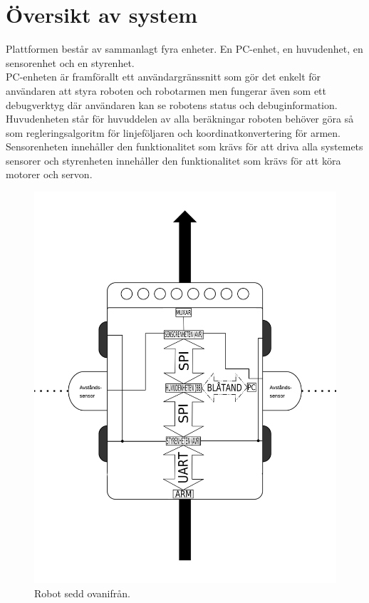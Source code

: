 \section{Översikt av system}
Plattformen består av sammanlagt fyra enheter. En PC-enhet, en huvudenhet, en sensorenhet och en styrenhet. \\
PC-enheten är framförallt ett användargränssnitt som gör det enkelt för användaren att styra roboten och robotarmen men fungerar även som ett debugverktyg där användaren kan se robotens status och debuginformation. Huvudenheten står för huvuddelen av alla beräkningar roboten behöver göra så som regleringsalgoritm för linjeföljaren och koordinatkonvertering för armen. Sensorenheten innehåller den funktionalitet som krävs för att driva alla systemets sensorer och styrenheten innehåller den funktionalitet som krävs för att köra motorer och servon.

\begin{figure}[h]
\center
\includegraphics[scale=0.32]{robot}
\caption{Robot sedd ovanifrån. } \label{designspec:robot}
\end{figure}

